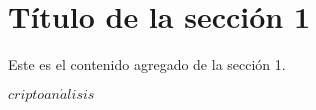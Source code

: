 \section{T\'itulo de la secci\'on 1}

Este es el contenido agregado de la secci\'on 1.

$criptoan\acute{a}lisis$